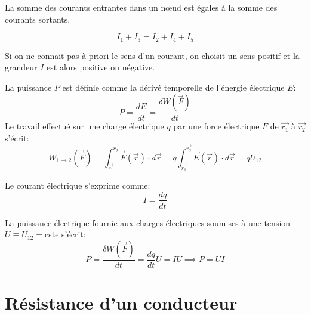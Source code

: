 \documentclass[
    11pt,
    a4paper,
    oneside,
    headinlcude, footinclude,
    twoside,
]{report}
\renewcommand{\vec}[1]{\overrightarrow{#1}}
\begin{document}
\begin{highlightBox}
    La somme des courants entrantes dans un nœud est  égales à la somme des
    courants sortants.
\end{highlightBox}

\begin{center}
    \begin{minipage}{.5\linewidth}
        \setlength{\parskip}{.3em}
        \begin{equation}
            \label{eq:8.6}
            I_1 + I_3 = I_2 + I_4 + I_5
        \end{equation}

        Si on ne connait pas à priori le sens d'un courant, on choisit un sens
        positif et la grandeur $I$ est alors positive ou négative.
    \end{minipage}
    \begin{minipage}{.49\linewidth}
    \end{minipage}
\end{center}

La puissance $P$ est définie comme la dérivé temporelle de l'énergie électrique
$E$:
\begin{equation}
    \label{eq:8.7}
    P = \frac{dE}{dt} = \frac{\delta W (\vec F)}{dt}
\end{equation}
Le travail effectué sur une charge électrique $q$ par une force électrique $F$
de $\vec{r_{1}}$ à $\vec{r_{2}}$ s'écrit:
\begin{equation}
    \label{eq:8.8}
    W_{1\to 2} (\vec F) = \int_{\vec{r_{1}}}^{\vec{r_{2}}} \vec F(\vec r) \cdot
    d\vec r = q \int_{\vec{r_{1}}}^{\vec{r_{2}}} \vec E(\vec r) \cdot d\vec r =
    q U_{12}
\end{equation}

Le courant électrique s'exprime comme:
\begin{equation}
    \label{eq:8.9}
    I = \frac{dq}{dt}
\end{equation}

La puissance électrique fournie aux charges électriques soumises à une tension
$U \equiv U_{12} = $cste s'écrit:
\begin{equation}
    \label{eq:8.10}
    P = \frac{\delta W(\vec F)}{dt} = \frac{dq}{dt} U = I U \implies P= UI
\end{equation}

\section{Résistance d'un conducteur}
\end{document}
